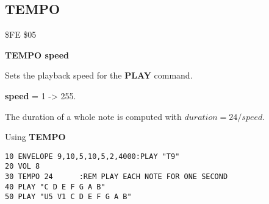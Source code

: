 
\newpage
\subsection{TEMPO}
\begin{description}[leftmargin=2cm,style=nextline]
\item [Token:] \$FE \$05
\item [Format:] {\bf TEMPO speed}
\item [Usage:] Sets the playback speed for the {\bf PLAY} command.

               {\bf speed} = 1 -> 255.

               The duration of a whole note is computed with
               $ duration = 24 / speed $.

\item [Example:] Using {\bf TEMPO}
\begin{tcolorbox}[colback=black,coltext=white]
\verbatimfont{\codefont}
\begin{verbatim}
10 ENVELOPE 9,10,5,10,5,2,4000:PLAY "T9"
20 VOL 8
30 TEMPO 24      :REM PLAY EACH NOTE FOR ONE SECOND
40 PLAY "C D E F G A B"
50 PLAY "U5 V1 C D E F G A B"
\end{verbatim}
\end{tcolorbox}
\end{description}


\newpage
